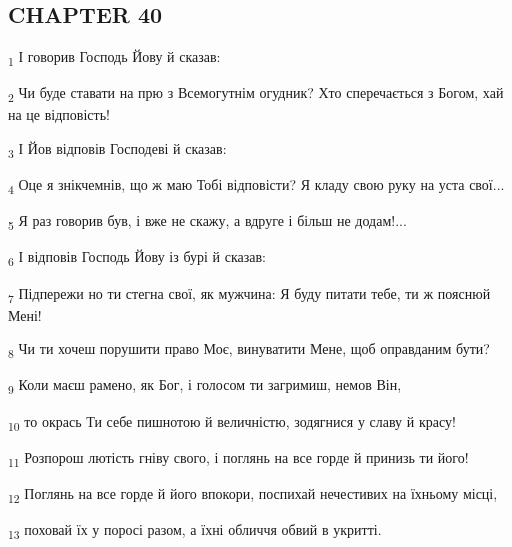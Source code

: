 \subsection{CHAPTER 40}
\begin{tcolorbox}
\textsubscript{1} І говорив Господь Йову й сказав:
\end{tcolorbox}
\begin{tcolorbox}
\textsubscript{2} Чи буде ставати на прю з Всемогутнім огудник? Хто сперечається з Богом, хай на це відповість!
\end{tcolorbox}
\begin{tcolorbox}
\textsubscript{3} І Йов відповів Господеві й сказав:
\end{tcolorbox}
\begin{tcolorbox}
\textsubscript{4} Оце я знікчемнів, що ж маю Тобі відповісти? Я кладу свою руку на уста свої...
\end{tcolorbox}
\begin{tcolorbox}
\textsubscript{5} Я раз говорив був, і вже не скажу, а вдруге і більш не додам!...
\end{tcolorbox}
\begin{tcolorbox}
\textsubscript{6} І відповів Господь Йову із бурі й сказав:
\end{tcolorbox}
\begin{tcolorbox}
\textsubscript{7} Підпережи но ти стегна свої, як мужчина: Я буду питати тебе, ти ж пояснюй Мені!
\end{tcolorbox}
\begin{tcolorbox}
\textsubscript{8} Чи ти хочеш порушити право Моє, винуватити Мене, щоб оправданим бути?
\end{tcolorbox}
\begin{tcolorbox}
\textsubscript{9} Коли маєш рамено, як Бог, і голосом ти загримиш, немов Він,
\end{tcolorbox}
\begin{tcolorbox}
\textsubscript{10} то окрась Ти себе пишнотою й величністю, зодягнися у славу й красу!
\end{tcolorbox}
\begin{tcolorbox}
\textsubscript{11} Розпорош лютість гніву свого, і поглянь на все горде й принизь ти його!
\end{tcolorbox}
\begin{tcolorbox}
\textsubscript{12} Поглянь на все горде й його впокори, поспихай нечестивих на їхньому місці,
\end{tcolorbox}
\begin{tcolorbox}
\textsubscript{13} поховай їх у поросі разом, а їхні обличчя обвий в укритті.
\end{tcolorbox}
